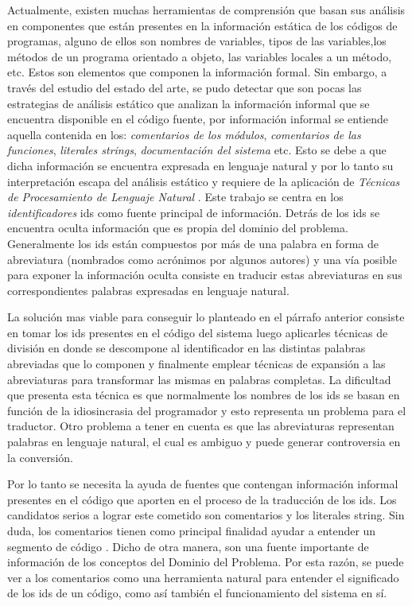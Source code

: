 \documentclass[12pt]{report}
\begin{document}
Actualmente, existen muchas herramientas de comprensión que basan sus análisis en componentes que están presentes en la información estática de los códigos de programas, alguno de ellos son nombres de variables, tipos de las variables,los métodos de un programa orientado a objeto, las variables locales a un método, etc. Estos son elementos que componen la información formal. Sin embargo, a través del estudio del estado del arte, se pudo detectar que son pocas las estrategias de análisis estático que analizan la información informal que se encuentra disponible en el código fuente, por información informal se entiende aquella contenida en 
los: \textit{comentarios de los módulos}, \textit{comentarios de las funciones}, \textit{literales strings}, \textit{documentación del sistema} etc.
Esto se debe a que dicha información se encuentra expresada en lenguaje natural y por lo tanto su interpretación escapa del análisis estático y requiere de la aplicación de \textit{Técnicas de Procesamiento de Lenguaje Natural} \cite{DCPHJP09,TERD01}.
Este trabajo se centra en los \textit{identificadores} ids como fuente principal de información. Detrás de los ids se encuentra oculta información que es propia del dominio del problema. Generalmente los ids están compuestos por más de una palabra en forma de abreviatura (nombrados como acrónimos por algunos autores) y una vía posible para exponer la información oculta consiste en traducir estas abreviaturas en sus correspondientes palabras expresadas en lenguaje natural.

La solución mas viable para conseguir lo planteado en el párrafo anterior consiste en tomar los ids presentes en el código del sistema luego aplicarles técnicas de división en donde se descompone al identificador en las distintas palabras abreviadas que lo componen
y finalmente emplear técnicas de expansión a las abreviaturas para transformar las mismas en palabras completas.
La dificultad que presenta esta técnica es que normalmente los nombres de los ids se basan en función de la idiosincrasia del 
programador \cite{LFBEX07, EHPV09}
y esto representa un problema para el traductor. Otro problema a tener en cuenta es que las abreviaturas representan palabras en lenguaje natural, el cual es ambiguo y puede generar controversia en la conversión.

Por lo tanto se necesita la ayuda de fuentes que contengan información informal presentes en el código que aporten en el proceso de la traducción de los ids. Los candidatos serios a lograr este cometido son comentarios y los literales string.
Sin duda, los comentarios tienen como principal finalidad ayudar a 
entender un segmento de código \cite{JDPH08}.
Dicho de otra manera, son una fuente importante de información de 
los conceptos del Dominio del Problema. 
Por esta razón, se puede ver a los comentarios como una herramienta 
natural para entender el significado de los ids de un código,
como así también el funcionamiento del sistema en sí.
\end{document}
